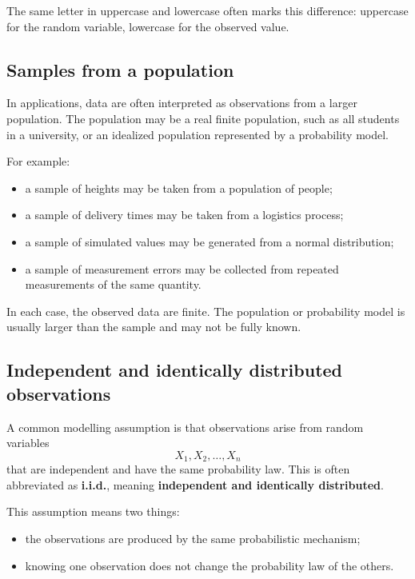 \begin{remarkbox}
The same letter in uppercase and lowercase often marks this difference:
uppercase for the random variable, lowercase for the observed value.
\end{remarkbox}

\subsection*{Samples from a population}

In applications, data are often interpreted as observations from a larger
population. The population may be a real finite population, such as all students
in a university, or an idealized population represented by a probability model.

For example:
\begin{itemize}
    \item a sample of heights may be taken from a population of people;
    \item a sample of delivery times may be taken from a logistics process;
    \item a sample of simulated values may be generated from a normal
    distribution;
    \item a sample of measurement errors may be collected from repeated
    measurements of the same quantity.
\end{itemize}

In each case, the observed data are finite. The population or probability model
is usually larger than the sample and may not be fully known.

\subsection*{Independent and identically distributed observations}

A common modelling assumption is that observations arise from random variables
\[
X_1,X_2,
\ldots,X_n
\]
that are independent and have the same probability law. This is often abbreviated
as \textbf{i.i.d.}, meaning \textbf{independent and identically distributed}.

This assumption means two things:
\begin{itemize}
    \item the observations are produced by the same probabilistic mechanism;
    \item knowing one observation does not change the probability law of the
    others.
\end{itemize}

